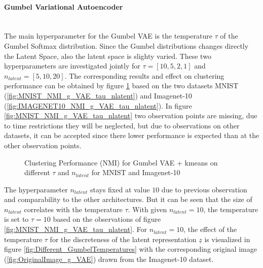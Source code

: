 \documentclass[12pt,DIV14,BCOR12mm,a4paper,footexclude,headinclude,halfparskip-,twoside,openright,cleardoubleempty,idxtotoc,bibtotoc,listtotoc]{scrreprt} %
\numberwithin{equation}{chapter}
\begin{document}
	\paragraph{Gumbel Variational Autoencoder}\hfill \\
	The main hyperparameter for the Gumbel VAE is the temperature $\tau$ of the Gumbel Softmax distribution. Since the Gumbel distributions changes directly the Latent Space, also the latent space is slighty varied. These two hyperparameters are investigated jointly for $\tau = [10, 5, 2, 1]$ and $n_{latent} = [5, 10, 20]$. The corresponding results and effect on clustering performance can be obtained by figure \ref{fig:ClusterPerformance_g_VAE_Hyperparameters} based on the two datasets MNIST (\ref{fig:MNIST_NMI_g_VAE_tau_nlatent}) and Imagenet-10 (\ref{fig:IMAGENET10_NMI_g_VAE_tau_nlatent}). In figure \ref{fig:MNIST_NMI_g_VAE_tau_nlatent} two observation points are missing, due to time restrictions they will be neglected, but due to observations on other datasets, it can be accepted since there lower performance is expected than at the other observation points.
	 \begin{figure}[htb!]
		\centering
		\qquad
		\caption{Clustering Performance (NMI) for Gumbel VAE + kmeans on different $\tau$ and $n_{latent}$ for MNIST and Imagenet-10}
		\label{fig:ClusterPerformance_g_VAE_Hyperparameters}
	\end{figure}
	The hyperparameter $n_{latent}$ stays fixed at value $10$ due to previous observation and comparability to the other architectures. But it can be seen that the size of $n_{latent}$ correlates with the temperature $\tau$. With given $n_{latent}=10$, the temperature is set to $\tau=10$ based on the observations of figure \ref{fig:MNIST_NMI_g_VAE_tau_nlatent}. For $n_{latent}=10$, the effect of the temperature $\tau$ for the discreteness of the latent representation $\underline{z}$ is visualized in figure \ref{fig:Different_GumbelTemperatures} with the corresponding original image (\ref{fig:OriginalImage_g_VAE}) drawn from the Imagenet-10 dataset.
\end{document}
